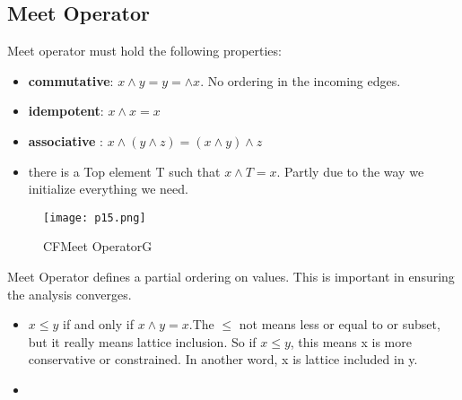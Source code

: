 \subsection{ Meet Operator }

Meet operator must hold the following properties:

\begin{itemize}
\item \textbf{commutative}: \(x \wedge y = y = \wedge x\). No ordering in the incoming edges.

\item \textbf{idempotent}: \(x \wedge x =  x\)

\item \textbf{associative }: \(x \wedge( y\wedge z) =  (x \wedge y) \wedge z\)

\item there is a Top element T such that \(x \wedge T = x\). Partly due to the way 
we initialize everything we need.
\end{itemize}

\begin{figure}[h]
    \centering
    \texttt{[image: p15.png]}
    \caption{CFMeet OperatorG}
    \label{fig:p15}
\end{figure}



Meet Operator defines a partial ordering on values. This is important in ensuring the analysis converges.
\begin{itemize}
\item \(x \leq y\) if and only if \(x \wedge y = x\).The \(\leq \) not means less or equal to or subset, but it really means lattice inclusion.
So if \(x \leq y\), this means x is more conservative or constrained. In another word, x is lattice included in y.
\item 

\end{itemize}





































